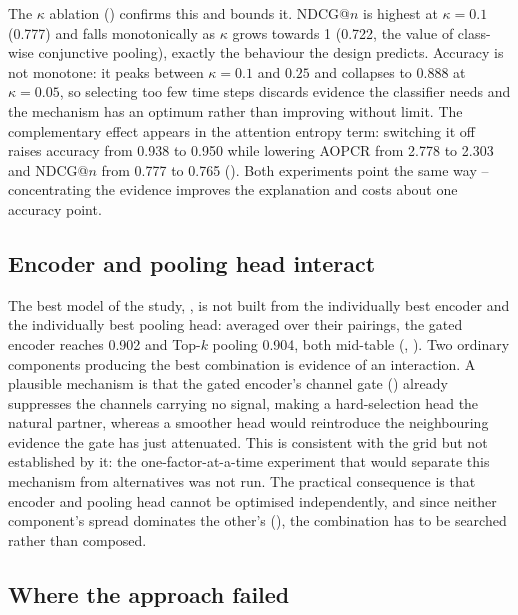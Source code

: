 The $\kappa$ ablation () confirms this and bounds it. NDCG@$n$ is highest at
$\kappa = 0.1$ (0.777) and falls monotonically as $\kappa$ grows towards 1 (0.722, the value of
class-wise conjunctive pooling), exactly the behaviour the design predicts. Accuracy is not
monotone: it peaks between $\kappa = 0.1$ and $0.25$ and collapses to 0.888 at $\kappa = 0.05$, so
selecting too few time steps discards evidence the classifier needs and the mechanism has an optimum
rather than improving without limit. The complementary effect appears in the attention entropy term:
switching it off raises accuracy from 0.938 to 0.950 while lowering AOPCR from 2.778 to 2.303 and
NDCG@$n$ from 0.777 to 0.765 (). Both experiments point the same way --
concentrating the evidence improves the explanation and costs about one accuracy point.

\subsection{Encoder and pooling head interact}
\label{sec:disc:interaction}

The best model of the study, \mgat{}, is not built from the individually best encoder and the
individually best pooling head: averaged over their pairings, the gated encoder reaches 0.902 and
Top-$k$ pooling 0.904, both mid-table (, ).
Two ordinary components producing the best combination is evidence of an interaction. A plausible
mechanism is that the gated encoder's channel gate () already suppresses the channels
carrying no signal, making a hard-selection head the natural partner, whereas a smoother head would
reintroduce the neighbouring evidence the gate has just attenuated. This is consistent with the grid
but not established by it: the one-factor-at-a-time experiment that would separate this mechanism
from alternatives was not run. The practical consequence is that encoder and pooling head cannot be
optimised independently, and since neither component's spread dominates the other's
(), the combination has to be searched rather than composed.

\subsection{Where the approach failed}
\label{sec:disc:negative}

